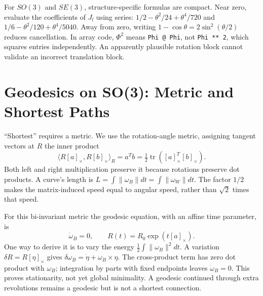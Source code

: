For $SO(3)$ and $SE(3)$, structure-specific formulas are compact. Near zero, evaluate the coefficients of $J_l$ using series: $1/2-\theta^2/24+\theta^4/720$ and $1/6-\theta^2/120+\theta^4/5040$. Away from zero, writing $1-\cos\theta=2\sin^2(\theta/2)$ reduces cancellation. In array code, $\Phi^2$ means \texttt{Phi @ Phi}, not \texttt{Phi ** 2}, which squares entries independently. An apparently plausible rotation block cannot validate an incorrect translation block.

\section{Geodesics on SO(3): Metric and Shortest Paths}
\label{sec:geodesics}
\label{sec:geodesic_riemannian_proof}

``Shortest'' requires a metric. We use the rotation-angle metric, assigning tangent vectors at $R$ the inner product
\begin{equation}
 \langle R[a]_\times,R[b]_\times\rangle_R
 =a^Tb=\tfrac12\operatorname{tr}([a]_\times^T[b]_\times).
 \label{eq:bi_invariant_metric}
\end{equation}
Both left and right multiplication preserve it because rotations preserve dot products. A curve's length is $L=\int\|\omega_B\|dt=\int\|\omega_W\|dt$. The factor $1/2$ makes the matrix-induced speed equal to angular speed, rather than $\sqrt2$ times that speed.

For this bi-invariant metric the geodesic equation, with an affine time parameter, is
\begin{equation}
 \dot\omega_B=0,\qquad
 R(t)=R_0\exp(t[a]_\times).
 \label{eq:geodesic_condition}
\end{equation}
One way to derive it is to vary the energy $\frac12\int\|\omega_B\|^2dt$. A variation $\delta R=R[\eta]_\times$ gives $\delta\omega_B=\dot\eta+\omega_B\times\eta$. The cross-product term has zero dot product with $\omega_B$; integration by parts with fixed endpoints leaves $\dot\omega_B=0$. This proves stationarity, not yet global minimality. A geodesic continued through extra revolutions remains a geodesic but is not a shortest connection.

